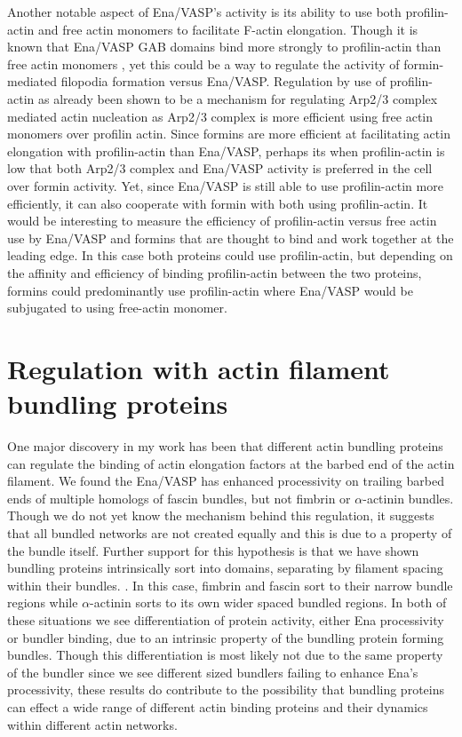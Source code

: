 Another notable aspect of Ena/VASP's activity is its ability to use both profilin-actin and free actin monomers to facilitate F-actin elongation. Though it is known that Ena/VASP GAB domains bind more strongly to profilin-actin than free actin monomers \citep{chereau_understanding_2006}, yet this could be a way to regulate the activity of formin-mediated filopodia formation versus Ena/VASP. Regulation by use of profilin-actin as already been shown to be a mechanism for regulating Arp2/3 complex mediated actin nucleation \citep{suarez_profilin_2015,rotty_profilin-1_2015} as Arp2/3 complex is more efficient using free actin monomers over profilin actin. Since formins are more efficient at facilitating actin elongation with profilin-actin than Ena/VASP, perhaps its when profilin-actin is low that both Arp2/3 complex and Ena/VASP activity is preferred in the cell over formin activity. Yet, since Ena/VASP is still able to use profilin-actin more efficiently, it can also cooperate with formin with both using profilin-actin. It would be interesting to measure the efficiency of profilin-actin versus free actin use by Ena/VASP and formins that are thought to bind and work together at the leading edge. In this case both proteins could use profilin-actin, but depending on the affinity and efficiency of binding profilin-actin between the two proteins, formins could predominantly use profilin-actin where Ena/VASP would be subjugated to using free-actin monomer.

\section{Regulation with actin filament bundling proteins}\label{ena-bundles-conclusions}
One major discovery in my work has been that different actin bundling proteins can regulate the binding of actin elongation factors at the barbed end of the actin filament. We found the Ena/VASP has enhanced processivity on trailing barbed ends of multiple homologs of fascin bundles, but not fimbrin or $\alpha$-actinin bundles. Though we do not yet know the mechanism behind this regulation, it suggests that all bundled networks are not created equally and this is due to a property of the bundle itself. Further support for this hypothesis is that we have shown bundling proteins intrinsically sort into domains, separating by filament spacing within their bundles. \citep{winkelman_fascin-_2016}. In this case, fimbrin and fascin sort to their narrow bundle regions while $\alpha$-actinin sorts to its own wider spaced bundled regions. In both of these situations we see differentiation of protein activity, either Ena processivity or bundler binding, due to an intrinsic property of the bundling protein forming bundles. Though this differentiation is most likely not due to the same property of the bundler since we see different sized bundlers failing to enhance Ena's processivity, these results do contribute to the possibility that bundling proteins can effect a wide range of different actin binding proteins and their dynamics within different actin networks. 

